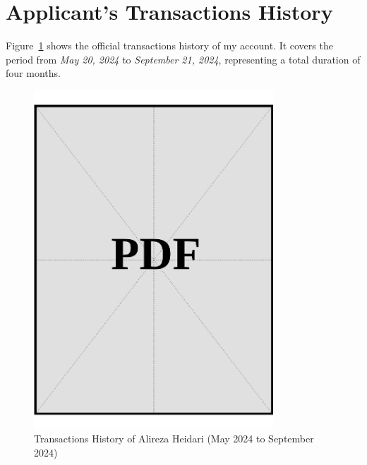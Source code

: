 \clearpage

\section{Applicant's Transactions History}
\label{sec:applicant-transactions-history}

\noindent
Figure~\ref{fig:applicant-transactions-history} shows the official transactions history of my account. It covers the period from \textit{May 20, 2024} to \textit{September 21, 2024}, representing a total duration of four months.

\vspace*{\fill}
\begin{figure}[h]
    \centering
    \includegraphics[page=1, width=0.8\textwidth]{../application-docs/applicant/funds/bank-account/transaction-history.pdf}
    \caption{Transactions History of Alireza Heidari (May 2024 to September 2024)}
    \label{fig:applicant-transactions-history}
\end{figure}
\vspace*{\fill}

\clearpage
